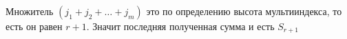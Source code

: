 \begin{prf}
\begin{description}[itemindent=0pt, leftmargin=25pt, labelsep=5pt]
		Множитель $(j_1 + j_2 + \dots + j_m)$ это по определению высота мультииндекса, то есть он равен $r + 1$. Значит последняя полученная сумма и есть $S_{r + 1}$
	\end{description}
\end{prf} %

